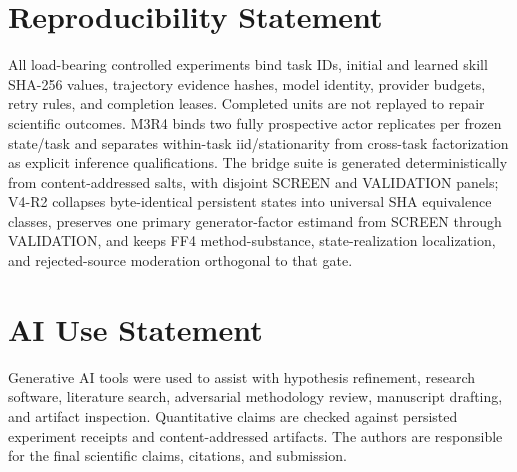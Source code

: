 \section*{Reproducibility Statement}
All load-bearing controlled experiments bind task IDs, initial and learned skill SHA-256 values, trajectory evidence hashes, model identity, provider budgets, retry rules, and completion leases. Completed units are not replayed to repair scientific outcomes. M3R4 binds two fully prospective actor replicates per frozen state/task and separates within-task iid/stationarity from cross-task factorization as explicit inference qualifications. The bridge suite is generated deterministically from content-addressed salts, with disjoint SCREEN and VALIDATION panels; V4-R2 collapses byte-identical persistent states into universal SHA equivalence classes, preserves one primary generator-factor estimand from SCREEN through VALIDATION, and keeps FF4 method-substance, state-realization localization, and rejected-source moderation orthogonal to that gate.

\section*{AI Use Statement}
Generative AI tools were used to assist with hypothesis refinement, research software, literature search, adversarial methodology review, manuscript drafting, and artifact inspection. Quantitative claims are checked against persisted experiment receipts and content-addressed artifacts. The authors are responsible for the final scientific claims, citations, and submission.
